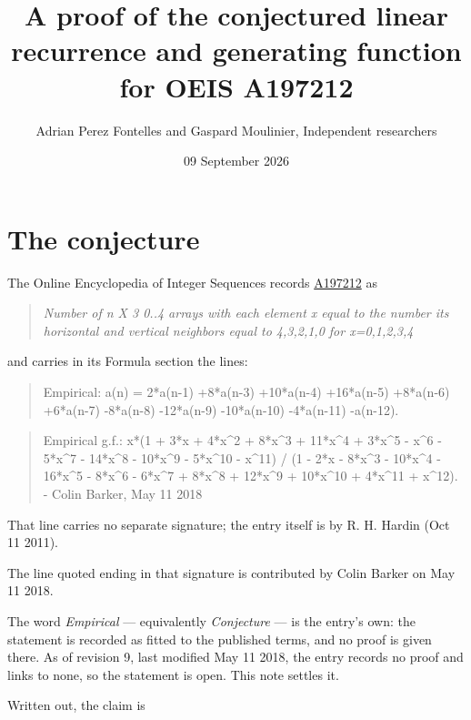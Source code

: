 \documentclass[11pt]{article}
\title{A proof of the conjectured linear recurrence and generating function for OEIS A197212}
\author{Adrian Perez Fontelles and Gaspard Moulinier, Independent researchers}
\date{09 September 2026}
\theoremstyle{definition}
\begin{document}
\maketitle
\section{The conjecture}

The Online Encyclopedia of Integer Sequences records \href{https://oeis.org/A197212}{A197212} as

\begin{quote}\itshape Number of n X 3 0..4 arrays with each element x equal to the number its horizontal and vertical neighbors equal to 4,3,2,1,0 for x=0,1,2,3,4\end{quote}

and carries in its Formula section the lines:

\begin{quote}\ttfamily Empirical: a(n) = 2*a(n-1) +8*a(n-3) +10*a(n-4) +16*a(n-5) +8*a(n-6) +6*a(n-7) -8*a(n-8) -12*a(n-9) -10*a(n-10) -4*a(n-11) -a(n-12).\end{quote}

\begin{quote}\ttfamily Empirical g.f.: x*(1 + 3*x + 4*x\textasciicircum{}2 + 8*x\textasciicircum{}3 + 11*x\textasciicircum{}4 + 3*x\textasciicircum{}5 - x\textasciicircum{}6 - 5*x\textasciicircum{}7 - 14*x\textasciicircum{}8 - 10*x\textasciicircum{}9 - 5*x\textasciicircum{}10 - x\textasciicircum{}11) / (1 - 2*x - 8*x\textasciicircum{}3 - 10*x\textasciicircum{}4 - 16*x\textasciicircum{}5 - 8*x\textasciicircum{}6 - 6*x\textasciicircum{}7 + 8*x\textasciicircum{}8 + 12*x\textasciicircum{}9 + 10*x\textasciicircum{}10 + 4*x\textasciicircum{}11 + x\textasciicircum{}12). - Colin Barker, May 11 2018\end{quote}

That line carries no separate signature; the entry itself is by R. H. Hardin (Oct 11 2011).

The line quoted ending in that signature is contributed by Colin Barker on May 11 2018.

The word {\itshape Empirical} --- equivalently {\itshape Conjecture} --- is the entry's own: the statement is recorded as fitted to the published terms, and no proof is given there. As of revision 9, last modified May 11 2018, the entry records no proof and links to none, so the statement is open. This note settles it.

Written out, the claim is
\end{document}
